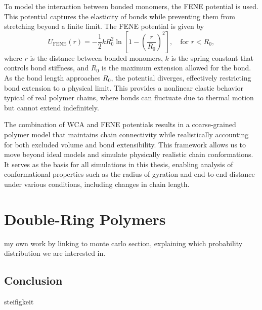 \documentclass{article}      %
\begin{document}
To model the interaction between bonded monomers, the FENE potential is used. This potential captures the elasticity of bonds while preventing them from stretching beyond a finite limit. The FENE potential is given by
\begin{equation}
U_{\text{FENE}}(r) = -\frac{1}{2} k R_0^2 \ln \left[ 1 - \left( \frac{r}{R_0} \right)^2 \right], \quad \text{for } r < R_0,
\end{equation}
where \( r \) is the distance between bonded monomers, \( k \) is the spring constant that controls bond stiffness, and \( R_0 \) is the maximum extension allowed for the bond. As the bond length approaches \( R_0 \), the potential diverges, effectively restricting bond extension to a physical limit. This provides a nonlinear elastic behavior typical of real polymer chains, where bonds can fluctuate due to thermal motion but cannot extend indefinitely.

The combination of WCA and FENE potentials results in a coarse-grained polymer model that maintains chain connectivity while realistically accounting for both excluded volume and bond extensibility. This framework allows us to move beyond ideal models and simulate physically realistic chain conformations. It serves as the basis for all simulations in this thesis, enabling analysis of conformational properties such as the radius of gyration and end-to-end distance under various conditions, including changes in chain length.

\newpage

\section{Double-Ring Polymers}
my own work
by linking to monte carlo section, explaining which probability distribution we are interested in.

\subsection{Conclusion}
steifigkeit


\pagebreak



\end{document}
